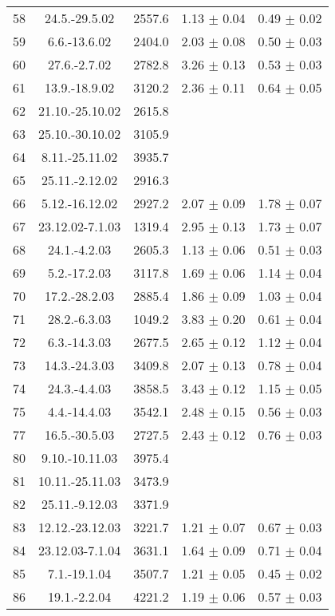 \documentclass[a4paper,12pt]{article}
\begin{document}
\begin{center}
\begin{longtable}{|c|c|c|c|c|}
    58	&	24.5.-29.5.02	&	2557.6	&	1.13 $\pm$ 0.04	&	0.49 $\pm$ 0.02	\\
    59	&	6.6.-13.6.02	&	2404.0	&	2.03 $\pm$ 0.08	&	0.50 $\pm$ 0.03	\\
    60	&	27.6.-2.7.02	&	2782.8	&	3.26 $\pm$ 0.13	&	0.53 $\pm$ 0.03	\\
    61	&	13.9.-18.9.02	&	3120.2	&	2.36 $\pm$ 0.11	&	0.64 $\pm$ 0.05	\\
    62	&	21.10.-25.10.02	&	2615.8	&		&		\\
    63	&	25.10.-30.10.02	&	3105.9	&		&		\\
    64	&	8.11.-25.11.02	&	3935.7	&		&		\\
    65	&	25.11.-2.12.02	&	2916.3	&		&		\\
    66	&	5.12.-16.12.02	&	2927.2	&	2.07 $\pm$ 0.09	&	1.78 $\pm$ 0.07	\\
    67	&	23.12.02-7.1.03	&	1319.4	&	2.95 $\pm$ 0.13	&	1.73 $\pm$ 0.07	\\
    68	&	24.1.-4.2.03	&	2605.3	&	1.13 $\pm$ 0.06	&	0.51 $\pm$ 0.03	\\
    69	&	5.2.-17.2.03	&	3117.8	&	1.69 $\pm$ 0.06	&	1.14 $\pm$ 0.04	\\
    70	&	17.2.-28.2.03	&	2885.4	&	1.86 $\pm$ 0.09	&	1.03 $\pm$ 0.04	\\
    71	&	28.2.-6.3.03	&	1049.2	&	3.83 $\pm$ 0.20	&	0.61 $\pm$ 0.04	\\
    72	&	6.3.-14.3.03	&	2677.5	&	2.65 $\pm$ 0.12	&	1.12 $\pm$ 0.04	\\
    73	&	14.3.-24.3.03	&	3409.8	&	2.07 $\pm$ 0.13	&	0.78 $\pm$ 0.04	\\
    74	&	24.3.-4.4.03	&	3858.5	&	3.43 $\pm$ 0.12	&	1.15 $\pm$ 0.05	\\
    75	&	4.4.-14.4.03	&	3542.1	&	2.48 $\pm$ 0.15	&	0.56 $\pm$ 0.03	\\
    77	&	16.5.-30.5.03	&	2727.5	&	2.43 $\pm$ 0.12	&	0.76 $\pm$ 0.03	\\
    80	&	9.10.-10.11.03	&	3975.4	&		&		\\
    81	&	10.11.-25.11.03	&	3473.9	&		&		\\
    82	&	25.11.-9.12.03	&	3371.9	&		&		\\
    83	&	12.12.-23.12.03	&	3221.7	&	1.21 $\pm$ 0.07	&	0.67 $\pm$ 0.03	\\
    84	&	23.12.03-7.1.04	&	3631.1	&	1.64 $\pm$ 0.09	&	0.71 $\pm$ 0.04	\\
    85	&	7.1.-19.1.04	&	3507.7	&	1.21 $\pm$ 0.05	&	0.45 $\pm$ 0.02	\\
    86	&	19.1.-2.2.04	&	4221.2	&	1.19 $\pm$ 0.06	&	0.57 $\pm$ 0.03	\\

\end{longtable}
\end{center}
\end{document}
